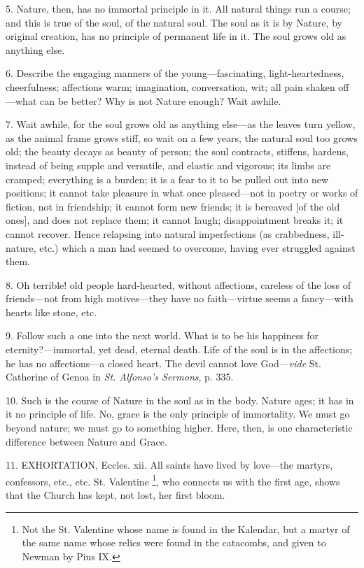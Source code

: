 5. Nature, then, has no immortal principle in it.
All natural things run a course; and this is true of the soul, of the
natural soul. The soul as it is by Nature, by original creation,
has no principle of permanent life in it. The soul grows old as
anything else.

6. Describe the engaging manners of the
young—fascinating, light-heartedness, cheerfulness; affections warm;
imagination, conversation, wit; all pain shaken off—what can be
better? Why is not Nature enough? Wait awhile.

7. Wait awhile, for the soul grows old as
anything else—as the leaves turn yellow, as the animal frame grows
stiff, so wait on a few years, the natural soul too grows old; the
beauty decays as beauty of person; the soul contracts, stiffens,
hardens, instead of being supple and versatile, and elastic and
vigorous; its limbs are cramped; everything is a burden; it is a fear
to it to be pulled out into new positions; it cannot take pleasure in
what once pleased—not in poetry or works of fiction, not in
friendship; it cannot form new friends; it is bereaved [of the old
ones], and does not replace them; it cannot laugh; disappointment
breaks it; it cannot recover. Hence relapsing into natural
imperfections (as crabbedness, ill-nature, etc.) which a man had
seemed to overcome, having ever struggled against them.

8. Oh terrible! old people hard-hearted, without
affections, careless of the loss of friends—not from high
motives—they have no faith—virtue seems a fancy—with hearts like
stone, etc.

9. Follow such a one into the next world. What is
to be his happiness for eternity?—immortal, yet dead, eternal death.
Life of the soul is in the affections; he has no affections—a closed
heart. The devil cannot love God—\emph{vide} St. Catherine of
Genoa in \emph{St. Alfonso's Sermons}, p. 335.

10. Such is the course of Nature in the soul as
in the body. Nature ages; it has in it no principle of life. No, grace
is the only principle of immortality. We must go beyond nature; we
must go to something higher. Here, then, is one characteristic
difference between Nature and Grace.

11. EXHORTATION,
Eccles. xii. All saints have lived by love—the martyrs, confessors,
etc., etc. St. Valentine \footnote{Not the St. Valentine
whose name is found in the Kalendar, but a martyr of the same name
whose relics were found in the catacombs, and given to Newman by Pius IX.},
who connects us with the first age, shows that the Church has kept,
not lost, her first bloom.


